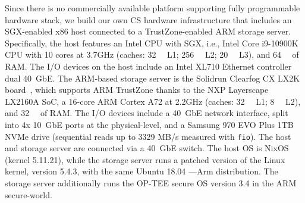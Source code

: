 Since there is no commercially available \csd platform supporting fully programmable hardware stack, we build our own CS hardware infrastructure that includes an SGX-enabled x86 host connected to a TrustZone-enabled ARM storage server.
Specifically, the host features an Intel CPU with SGX, i.e., Intel Core i9-10900K CPU with 10 cores at 3.7GHz (caches: \SI{32}{\kibi\byte} L1; \SI{256}{\kibi\byte} L2; \SI{20}{\mebi\byte} L3), and \SI{64}{\gibi\byte} of RAM. The I/O devices on the host include an Intel XL710 Ethernet controller dual 40~GbE. %
The ARM-based storage server is the Solidrun Clearfog CX LX2K board~\cite{clearfog}, 
which supports ARM TrustZone thanks to the NXP Layerscape LX2160A SoC, a 16-core ARM Cortex A72 at 2.2GHz (caches: \SI{32}{\kibi\byte} L1; \SI{8}{\mebi\byte} L2), and \SI{32}{\gibi\byte} of RAM. The I/O devices include a 40~GbE network interface, split into 4x 10~GbE ports at the physical-level, and a Samsung 970 EVO Plus 1\unit{TB} NVMe drive (sequential reads up to 3329 MB/s measured with \texttt{fio}).
The host and storage server are connected via a 40~GbE switch.
The host OS is NixOS (kernel 5.11.21), while the storage server runs a patched version of the Linux kernel, version 5.4.3, with the same Ubuntu 18.04 ---Arm distribution. The storage server additionally runs the OP-TEE secure OS version 3.4 in the ARM secure-world.

